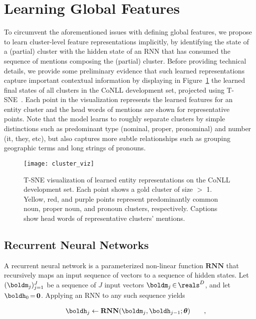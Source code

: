 \documentclass[11pt,letterpaper]{article}
\newcommand{\RNN}{\mathrm{\mathbf{RNN}}}
\renewcommand{\btheta}{\boldsymbol{\theta}}
\newcommand{\nicein}{\ensuremath{\,{\in}\,}}
\newcommand{\niceq}{\ensuremath{\,{=}\,}}
\newcommand{\eqpunc}[1]{{\makebox[0pt][l]{\qquad\rm{#1}}}}
\begin{document}
\section{Learning Global Features}
\label{sec:learnglobal}
To circumvent the aforementioned issues with defining global features, we propose to
learn cluster-level feature representations implicitly,
by identifying the state of a (partial) cluster with the hidden state
of an RNN that has consumed the sequence of mentions composing the
(partial) cluster. Before providing technical details,
we provide some preliminary evidence that such learned
representations capture important contextual information by displaying
in Figure~\ref{fig:clustviz} the learned final states of all clusters in the
CoNLL development set, projected using
T-SNE~\cite{maaten12visualizing}. Each point in the visualization
represents the learned features for an entity cluster and the head
words of mentions are shown for representative points. Note that the
model learns to roughly separate clusters by simple distinctions such
as predominant type (nominal, proper, pronominal) and number (it, they,
etc), but also captures more subtle relationships such as grouping
geographic terms and long strings of pronouns.

\begin{figure}[t!]
\centering
\texttt{[image: cluster\_viz]}
\caption{T-SNE  visualization of
  learned entity representations on the CoNLL development set. Each point shows a gold cluster of size $>$ 1. Yellow, red, and purple points represent predominantly common
  noun, proper noun, and pronoun clusters, respectively. Captions
  show head words of representative clusters' mentions.}
\label{fig:clustviz}
\end{figure}

\subsection{Recurrent Neural Networks}
A recurrent neural network is a parameterized non-linear function $\RNN$ that recursively maps an input sequence of vectors to a sequence of hidden states. 
Let $(\boldm_j)_{j=1}^J$ be a sequence of $J$ input vectors $\boldm_j \nicein \reals^{D}$, and let $\boldh_0 \niceq \mathbf{0}$. Applying an RNN to any such sequence yields    

\vspace{-5mm}
{\small
\begin{align*}
\boldh_j \gets \RNN(\boldm_j, \boldh_{j-1}; \btheta)\eqpunc{,}
\end{align*}
}
\end{document}
